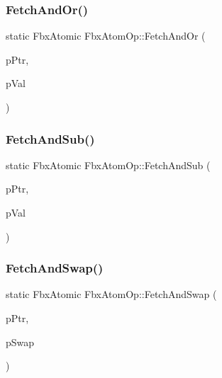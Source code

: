 \mbox{\label{class_fbx_atom_op_ab02a669c407687e914a2b373f1b66d69}} 
\subsubsection{\texorpdfstring{Fetch\+And\+Or()}{FetchAndOr()}}
{\footnotesize\ttfamily static Fbx\+Atomic Fbx\+Atom\+Op\+::\+Fetch\+And\+Or (\begin{DoxyParamCaption}\item[{volatile Fbx\+Atomic $\ast$}]{p\+Ptr,  }\item[{Fbx\+Atomic}]{p\+Val }\end{DoxyParamCaption})\hspace{0.3cm}{\ttfamily [static]}}

\mbox{\label{class_fbx_atom_op_a05cd6e4895f7459453464434728de7c3}} 
\subsubsection{\texorpdfstring{Fetch\+And\+Sub()}{FetchAndSub()}}
{\footnotesize\ttfamily static Fbx\+Atomic Fbx\+Atom\+Op\+::\+Fetch\+And\+Sub (\begin{DoxyParamCaption}\item[{volatile Fbx\+Atomic $\ast$}]{p\+Ptr,  }\item[{Fbx\+Atomic}]{p\+Val }\end{DoxyParamCaption})\hspace{0.3cm}{\ttfamily [static]}}

\mbox{\label{class_fbx_atom_op_a794938359397610bea4bfb4e5f005ab3}} 
\subsubsection{\texorpdfstring{Fetch\+And\+Swap()}{FetchAndSwap()}}
{\footnotesize\ttfamily static Fbx\+Atomic Fbx\+Atom\+Op\+::\+Fetch\+And\+Swap (\begin{DoxyParamCaption}\item[{volatile Fbx\+Atomic $\ast$}]{p\+Ptr,  }\item[{Fbx\+Atomic}]{p\+Swap }\end{DoxyParamCaption})\hspace{0.3cm}{\ttfamily [static]}}

